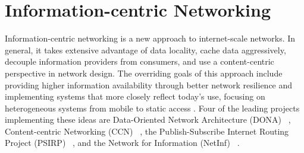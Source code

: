 \section{Information-centric Networking}
\label{section:information-centric-networking}

%

Information-centric networking is a new approach to internet-scale networks.  In general, it takes extensive advantage of data locality, cache data aggressively, decouple information providers from consumers, and use a content-centric perspective in network design. The overriding goals of this approach include providing higher information availability through better network resilience and implementing systems that more closely reflect today's use, focusing on heterogeneous systems from mobile to static access \cite{6231276}.  Four of the leading projects implementing these ideas are Data-Oriented Network Architecture (DONA) ~\cite{Koponen:2007:DNA:1282427.1282402}, Content-centric Networking (CCN) ~\cite{NDN,CCNx}, the Publish-Subscribe Internet Routing Project (PSIRP) ~\cite{PSIRP}, and the Network for Information (NetInf) ~\cite{NetInf}.

%		
%		
%
%
	